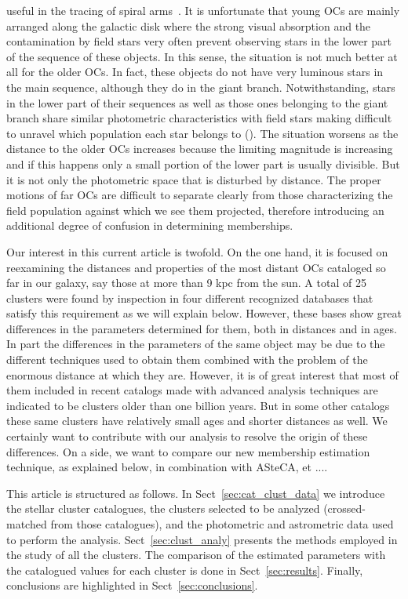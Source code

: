 \documentclass{aa}
\begin{document}
 useful in the tracing of spiral arms~\citep{carraro_2013,Molina_2018}. It is unfortunate that young OCs are mainly arranged along the 
galactic disk where the strong visual absorption and the contamination by 
field stars very often prevent observing stars in the lower part of the sequence of 
these objects. In this sense, the situation is not much better at all for the older OCs. In fact, these objects do not have very luminous stars in the main sequence, although they do in the giant branch. Notwithstanding, stars in the lower part of their sequences as well as those ones belonging to the giant branch share similar photometric characteristics with field stars making difficult to unravel which population each star belongs to (\cite{Hayes2015}). 
The situation worsens as the distance to the older OCs increases because the limiting magnitude is increasing and if this happens only a small portion 
of the lower part is usually divisible. But it is not only the photometric space that is disturbed by distance. The proper motions of far OCs are difficult to separate clearly from those characterizing the field population against which we see them projected, therefore introducing an additional degree of confusion in determining memberships.

Our interest in this current article is twofold. On the one hand, it is focused on reexamining the distances
and properties of the most distant OCs cataloged so far in our galaxy, say 
those at more than 9 kpc from the sun. A total of 25 clusters were found by inspection 
in four different recognized databases that satisfy this requirement as we will 
explain below. However, these bases show great differences in the parameters 
determined for them, both in distances and in ages. In part the differences in the 
parameters of the same object may be due to the different techniques used to obtain 
them combined with the problem of the enormous distance at which they are. However, 
it is of great interest that most of them included in recent catalogs made with advanced 
analysis techniques are indicated to be clusters older than one billion years. 
But in some other catalogs these same clusters have relatively small ages and shorter 
distances as well. We certainly want to contribute with our analysis to resolve the 
origin of these differences.
On a side, we want to compare our new membership estimation technique, as explained below, in combination with ASteCA, et ....


 This article is structured as follows. In Sect~\ref{sec:cat_clust_data} we
 introduce the stellar cluster catalogues, the clusters selected to be
 analyzed (crossed-matched from those catalogues), and the photometric and 
 astrometric data used to perform the analysis. Sect~\ref{sec:clust_analy}
 presents the methods employed in the study of all the clusters. The comparison
 of the estimated parameters with the catalogued values for each cluster is done
 in Sect~\ref{sec:results}. Finally, conclusions are highlighted in
 Sect~\ref{sec:conclusions}.
\end{document}
